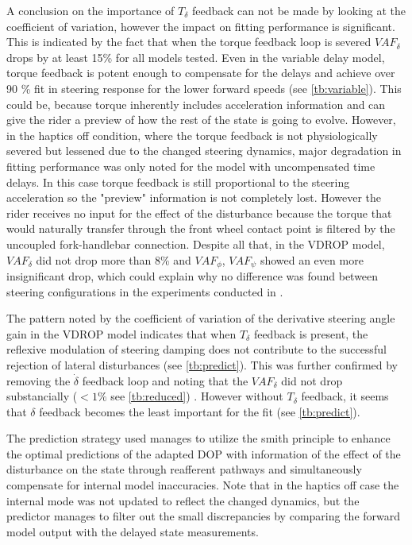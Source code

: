 A conclusion on the importance of \ensuremath{T_\delta} feedback can not be made by looking at the coefficient of variation, however the impact on fitting performance is significant. This is  indicated  by the fact that when the torque feedback loop is severed \ensuremath{\mathit{VAF}_\delta} drops by at least 15\% for all models tested. Even in the variable delay model, torque feedback is potent enough to compensate for the delays and achieve over 90 \% fit in steering response for the lower forward speeds (see \cref{tb:variable}). This could be, because torque inherently includes acceleration information and can give  the rider a preview of how the rest of the state is going to evolve. However, in the haptics off condition, where the torque feedback is not physiologically severed but lessened due to the changed steering dynamics,  major  degradation in fitting performance was only noted for the model with uncompensated time delays. In this case torque feedback is still proportional to the steering acceleration so the "preview" information is not completely lost. However the rider receives no input for the effect of the disturbance because the torque that would naturally transfer through the front wheel contact point is filtered by the uncoupled fork-handlebar connection.  Despite all that, in the VDROP model, \ensuremath{VAF_\delta} did not drop more than 8\% and \ensuremath{VAF_\phi}, \ensuremath{VAF_\psi} showed an even more insignificant drop, which could explain why no difference was found between steering configurations in the experiments conducted in \cite{dialynaseffect}. 

The pattern noted by the coefficient of variation of the derivative steering angle gain in the VDROP model indicates that when  \ensuremath{T_\delta} feedback  is present, the reflexive modulation of steering damping does not contribute to the successful rejection of lateral disturbances (see \cref{tb:predict}).  This was further confirmed by removing the \ensuremath{\dot{\delta}} feedback loop and noting that the \ensuremath{\mathit{VAF}_\delta} did not drop substancially (\ensuremath{< 1\%} see \cref{tb:reduced}) . However without \ensuremath{T_\delta} feedback,  it seems that \ensuremath{{\delta}} feedback becomes the least important for the fit (see \cref{tb:predict}). 


The  prediction strategy used  manages to utilize the smith  principle to enhance the optimal  predictions of the adapted DOP with  information of the effect of the disturbance on the state through reafferent pathways and simultaneously compensate for internal model inaccuracies. Note that in the haptics off case the internal mode was not updated to reflect the changed dynamics, but the predictor manages to filter out the small discrepancies by comparing the forward model output with the delayed state measurements. 

